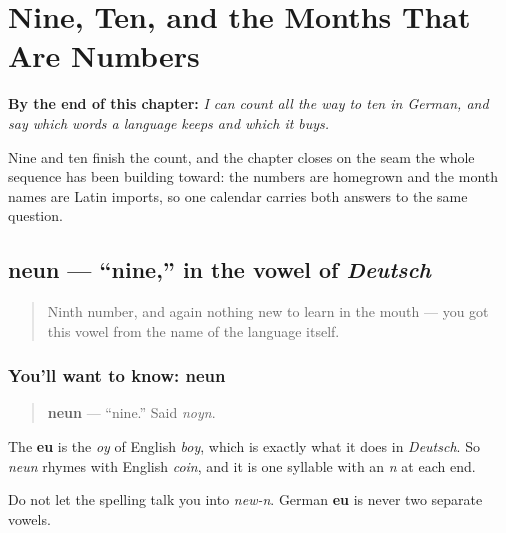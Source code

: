 
\chapter{Nine, Ten, and the Months That Are Numbers}
\label{ch:ge-zahlen-9-10}

\begin{chapteropening}
\textbf{By the end of this chapter:} \emph{I can count all the way to ten in German, and say which words a language keeps and which it buys.}

Nine and ten finish the count, and the chapter closes on the seam the whole sequence has been building toward: the numbers are homegrown and the month names are Latin imports, so one calendar carries both answers to the same question.
\end{chapteropening}

\section[neun]{neun — \textquotedblleft{}nine,\textquotedblright{} in the vowel of \emph{Deutsch}}

\label{lesson:GE-C06-neun}



\begin{quote}
Ninth number, and again nothing new to learn in the mouth — you got this vowel from the name of the language itself.
\end{quote}

\subsection*{You'll want to know: neun}
\begin{quote}
\textbf{neun} — \textquotedblleft{}nine.\textquotedblright{} Said \emph{noyn}.
\end{quote}

The \textbf{eu} is the \emph{oy} of English \emph{boy}, which is exactly what it does in \emph{Deutsch}. So \emph{neun} rhymes with English \emph{coin}, and it is one syllable with an \emph{n} at each end.

Do not let the spelling talk you into \emph{new-n}. German \textbf{eu} is never two separate vowels.

